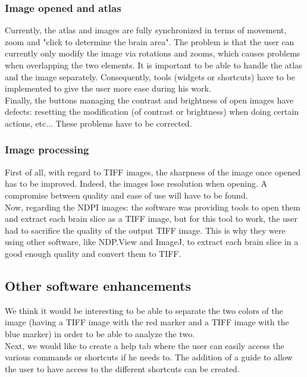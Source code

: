 \documentclass[a4paper,12pt]{report}
\begin{document}
\subsubsection{Image opened and atlas}
Currently, the atlas and images are fully synchronized in terms of movement, zoom and "click to determine the brain area". The problem is that the user can currently only modify the image via rotations and zooms, which causes problems when overlapping the two elements. It is important to be able to handle the atlas and the image separately. Consequently, tools (widgets or shortcuts) have to be implemented to give the user more ease during his work.\\

Finally, the buttons managing the contrast and brightness of open images have defects: resetting the modification (of contrast or brightness) when doing certain actions, etc... These problems have to be corrected. \\

\subsubsection{Image processing}
First of all, with regard to TIFF images, the sharpness of the image once opened has to be improved. Indeed, the images lose resolution when opening. A compromise between quality and ease of use will have to be found. \\

Now, regarding the NDPI images: the software was providing tools to open them and extract each brain slice as a TIFF image, but for this tool to work, the user had to sacrifice the quality of the output TIFF image. This is why they were using other software, like NDP.View and ImageJ, to extract each brain slice in a good enough quality and convert them to TIFF.\\

\subsection{Other software enhancements}
We think it would be interesting to be able to separate the two colors of the image (having a TIFF image with the red marker and a TIFF image with the blue marker) in order to be able to analyze the two.\\

Next, we would like to create a help tab where the user can easily access the various commands or shortcuts if he needs to. The addition of a guide to allow the user to have access to the different shortcuts can be created.\\
\end{document}
